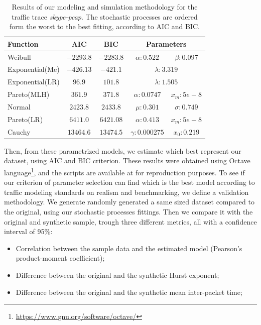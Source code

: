 \begin{table}[t]
\centering
\caption{Results of our modeling and simulation methodology for the traffic trace \textit{skype-pcap}. The stochastic processes are ordered form the worst to the best fitting, according to AIC and BIC.}
\label{tab:skype-results}
\begin{tabular}{lcccc}
\hline
Function        & AIC         & BIC        & \multicolumn{2}{c}{Parameters}      \\ \hline
Weibull         & $-2293.8$   & $-2283.8$ & $\alpha:0.522$ & $\beta:0.097$  \\
Exponential(Me) & $-426.13$   & $-421.1$  & \multicolumn{2}{c}{$\lambda:3.319$}  \\
Exponential(LR) & $96.9$   & $101.8$  & \multicolumn{2}{c}{$\lambda:1.505$}         \\
Pareto(MLH)     & $361.9$   & $371.8$  & $\alpha:0.0747$ & $x_m:5e-8$       \\
Normal          & $2423.8$    & $2433.8$   & $\mu:0.301 $   & $\sigma:0.749$ \\
Pareto(LR)      & $6411.0$   & $6421.08$  & $\alpha:0.413$ & $x_m:5e-8$       \\
Cauchy          & $13464.6$    & $13474.5$   & $\gamma:0.000275$ & $x_0:0.219$    \\ \hline
\end{tabular}
\end{table}

Then, from these parametrized models, we estimate which best represent our dataset, using AIC  and BIC criterion. These results were obtained using Octave language\footnote{ \href{https://www.gnu.org/software/octave/}{https://www.gnu.org/software/octave/}}, and the scripts are available at \cite{projeto-github} for reproduction purposes. To see if our criterion of parameter selection can find which is the best model according to traffic modeling standards on realism and benchmarking\cite{validate-trafficgen}, we define a validation methodology. We generate randomly generated a same sized dataset compared to the original, using our stochastic processes fittings.  Then we compare it with the original and synthetic sample, trough three different metrics, all with a confidence interval of 95\%:

\begin{itemize}
\item Correlation between the sample data and the estimated model (Pearson's product-moment coefficient);
\item Difference between the original and the synthetic Hurst exponent;
\item Difference between the original and the synthetic mean inter-packet time;
\end{itemize}

